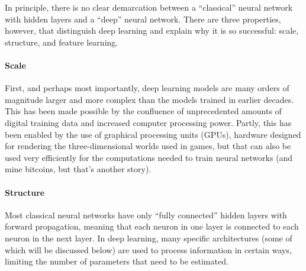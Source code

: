 In principle, there is no clear demarcation between a ``classical'' neural network with hidden layers and a ``deep'' neural network.
There are three properties, however, that distinguish deep learning and explain why it is so successful: scale, structure, and feature learning.

\paragraph{Scale} First, and perhaps most importantly, deep learning models are many orders of magnitude larger and more complex than the models
trained in earlier decades.
This has been made possible by the confluence of unprecedented amounts of digital training data and increased computer processing power.
Partly, this has been enabled by the use of graphical processing units (GPUs), hardware designed for rendering the three-dimensional worlds used in games,
but that can also be used very efficiently for the computations needed to train neural networks (and mine bitcoins, but that's another story).

\paragraph{Structure} Most classical neural networks have only ``fully connected'' hidden layers with forward propagation,
meaning that each neuron in one layer is connected to each neuron in the next layer.
In deep learning, many specific architectures (some of which will be discussed below) are used to process information in certain ways,
limiting the number of parameters that need to be estimated.

